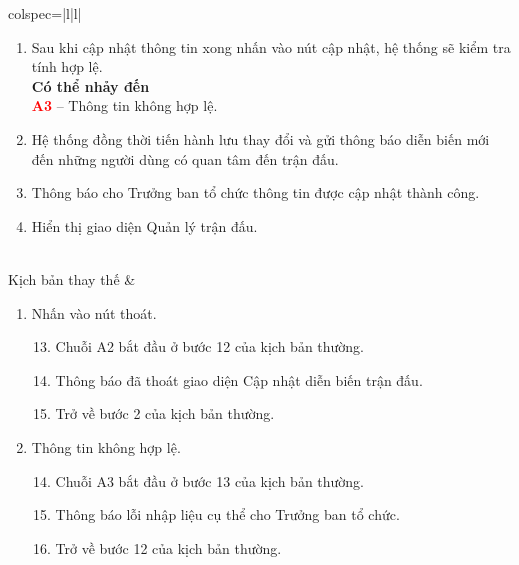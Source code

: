 \documentclass{article}
\begin{document}
\begin{longtblr}[caption = {Đặc tả usecase Cập nhật diễn biến trận đấu},
label = {tab:usecase1-spec},]{colspec={|l|l|}}
\begin{minipage}{5in}
\begin{enumerate}
\textbf{Có thể nhảy đến}\\
\textbf{\textcolor{red}{A2}} -- Không nhập nữa và nhất nút thoát.
\item Sau khi cập nhật thông tin xong nhấn vào nút cập nhật, hệ thống sẽ kiểm tra tính hợp lệ.\\
\textbf{Có thể nhảy đến}\\
\textbf{\textcolor{red}{A3}} -- Thông tin không hợp lệ.
\item Hệ thống đồng thời tiến hành lưu thay đổi và gửi thông báo diễn biến mới đến những người dùng có quan tâm đến trận đấu.
\item Thông báo cho Trưởng ban tổ chức thông tin được cập nhật thành công.
\item Hiển thị giao diện Quản lý trận đấu.  
 \end{enumerate}
\vskip 1pt
\end{minipage}  
 \\\hline
Kịch bản thay thế &
\begin{minipage}{5in}
\vskip 4pt
\begin{enumerate}[label={\textbf{\textcolor{red}{A\arabic*}} --}, align=left, itemsep=-5pt, start=2]
\item Nhấn vào nút thoát. \\
\vspace{-2em}
\begin{enumerate}[leftmargin=-5px, align=left, label=\arabic*.]
\setcounter{enumii}{12}
\item[]
\hspace{-25px} Chuỗi A2 bắt đầu ở bước 12 của kịch bản thường.
\item Thông báo đã thoát giao diện Cập nhật diễn biến trận đấu.
\item[]
\hspace{-25px} Trở về bước 2 của kịch bản thường.
\end{enumerate}
\item Thông tin không hợp lệ. \\
\vspace{-2em}
\begin{enumerate}[leftmargin=-5px, align=left, label=\arabic*.]
\setcounter{enumii}{13}
\item[]
\hspace{-25px} Chuỗi A3 bắt đầu ở bước 13 của kịch bản thường.
\item Thông báo lỗi nhập liệu cụ thể cho Trưởng ban tổ chức.
\item[]
\hspace{-25px} Trở về bước 12 của kịch bản thường.

\end{enumerate}
\end{enumerate}
\end{minipage}
\end{longtblr}
\end{document}
